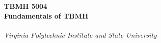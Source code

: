 
\begin{titlepage}

{~ \\[5cm] }

\noindent \HRule \\[0.4cm]
{ \Huge \bfseries TBMH 5004 \\[0.4cm] }
{ \huge \bfseries Fundamentals of TBMH \\ }
\HRule \\[0.4cm]

{ \large \emph{Virginia Polytechnic Institute and State University} }
\end{titlepage}